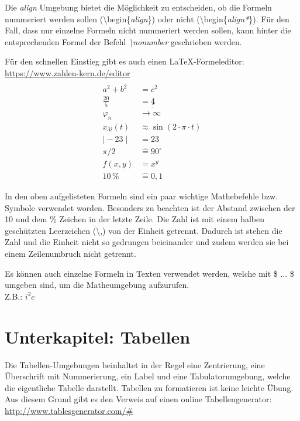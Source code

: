 Die \textit{align} Umgebung bietet die Möglichkeit zu entscheiden, ob die Formeln nummeriert werden sollen (\textbackslash begin\{\textit{align}\}) oder nicht (\textbackslash begin\{\textit{align*}\}). Für den Fall, dass nur einzelne Formeln nicht nummeriert werden sollen, kann hinter die entsprechenden Formel der Befehl \textit{\textbackslash nonumber} geschrieben werden.

Für den schnellen Einstieg gibt es auch einen LaTeX-Formeleditor:\\ \url{https://www.zahlen-kern.de/editor}
\begin{align*}
\\ a^2+b^2 & = c^2
\\ \frac{20}{5} & = \underline{\underline{4}}
\\ \varphi_n & \rightarrow\infty
\\ x_{3i}(t) & \approx \sin(2 \cdot \pi \cdot t)
\\ \mid-23\mid & = 23
\\ \pi/2 & \mathrel{\widehat{=}} 90^\circ
\\ f(x, y) & = x^y
\\ 10\,\% & \mathrel{\widehat{=}} 0,1
\end{align*}

In den oben aufgelisteten Formeln sind ein paar wichtige Mathebefehle bzw. Symbole verwendet worden.
Besonders zu beachten ist der Abstand zwischen der 10 und dem \% Zeichen in der letzte Zeile. Die Zahl ist mit einem halben geschützten Leerzeichen (\textbackslash ,) von der Einheit getrennt. Dadurch ist stehen die Zahl und die Einheit nicht so gedrungen beieinander und zudem werden sie bei einem Zeilenumbruch nicht getrennt.


Es können auch einzelne Formeln in Texten verwendet werden, welche mit \$ ... \$ umgeben sind, um die Matheumgebung aufzurufen.
\\ Z.B.: $ i^2c $



\newpage
\section{Unterkapitel: Tabellen}

Die Tabellen-Umgebungen beinhaltet in der Regel eine Zentrierung, eine Überschrift mit Nummerierung, ein Label und eine Tabulatorumgebung, welche die eigentliche Tabelle darstellt. Tabellen zu formatieren ist keine leichte Übung. Aus diesem Grund gibt es den Verweis auf einen online Tabellengenerator:\\ \url{http://www.tablesgenerator.com/#}

